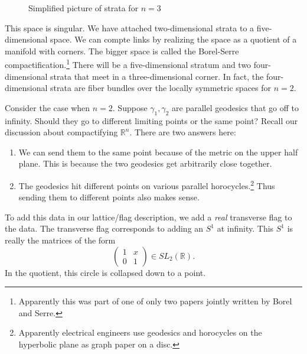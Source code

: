 \documentclass[leqno, openany]{memoir}
\theoremstyle{definition}
\theoremstyle{remark}
\theoremstyle{plain}
\theoremstyle{definition}
\theoremstyle{remark}
\newcommand{\R}{\mathbb{R}}
\begin{document}
\begin{figure}[H]
\begin{center}
        \end{center}
        \caption{Simplified picture of strata for $n=3$}%
        \label{fig:strata-n3}
        \end{figure}
This space is singular. We have attached two-dimensional strata to a five-dimensional space. We can compte links by realizing the space as a quotient of a manifold with corners. The bigger space is called the Borel-Serre compactification.\footnote{Apparently this was part of one of only two papers jointly written by Borel and Serre.} There will be a five-dimensional stratum and two four-dimensional strata that meet in a three-dimensional corner. In fact, the four-dimensional strata are fiber bundles over the locally symmetric spaces for $n=2$.

Consider the case when $n=2$. Suppose $\gamma_1, \gamma_2$ are parallel geodesics that go off to infinity. Should they go to different limiting points or the same point? Recall our discussion about compactifying $\R^n$. There are two answers here:
\begin{enumerate}
    \item We can send them to the same point because of the metric on the upper half plane. This is because the two geodesics get arbitrarily close together.
    \item The geodesics hit different points on various parallel horocycles.\footnote{Apparently electrical engineers use geodesics and horocycles on the hyperbolic plane as graph paper on a disc.} Thus sending them to different points also makes sense.
\end{enumerate}
To add this data in our lattice/flag description, we add a \textit{real} transverse flag to the data. The transverse flag corresponds to adding an $S^1$ at infinity. This $S^1$ is really the matrices of the form
\[ \begin{pmatrix}
    1 & x \\ 0 & 1
\end{pmatrix} \in SL_2(\R). \]
In the quotient, this circle is collapsed down to a point.
\end{document}
